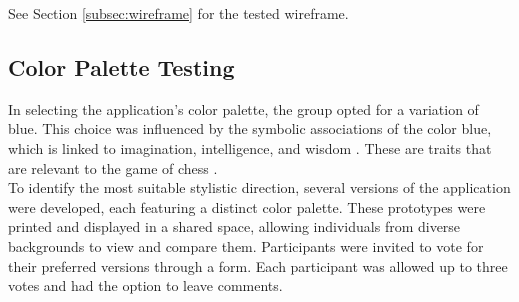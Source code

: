See Section \ref{subsec:wireframe} for the tested wireframe.



\subsection{Color Palette Testing}
\label{subsubsec:color-palette}

In selecting the application’s color palette, the group opted for a variation of blue. This choice was influenced by the symbolic associations of the color blue, which is linked to imagination, intelligence, and wisdom \cite{blue}. These are traits that are relevant to the game of chess \cite{chess:ppqty, chess:chess-and-creativity}. \\

To identify the most suitable stylistic direction, several versions of the application were developed, each featuring a distinct color palette. These prototypes were printed and displayed in a shared space, allowing individuals from diverse backgrounds to view and compare them. Participants were invited to vote for their preferred versions through a form. Each participant was allowed up to three votes and had the option to leave comments.
